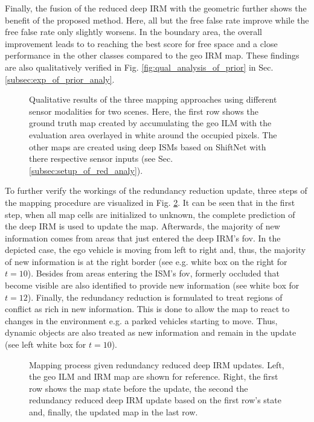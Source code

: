 Finally, the fusion of the reduced deep IRM with the geometric further shows the benefit of the proposed method. Here, all but the free false rate improve while the free false rate only slightly worsens. In the boundary area, the overall improvement leads to to reaching the best score for free space and a close performance in the other classes compared to the geo IRM map. These findings are also qualitatively verified in Fig. \ref{fig:qual_analysis_of_prior} in Sec. \ref{subsec:exp_of_prior_analy}.
\begin{figure}[H]
	\begin{center}
		\caption{\label{fig:qual_analysis_of_redundant_info}Qualitative results of the three mapping approaches using different sensor modalities for two scenes. Here, the first row shows the ground truth map created by accumulating the geo ILM with the evaluation area overlayed in white around the occupied pixels. The other maps are created using deep ISMs based on ShiftNet with there respective sensor inputs (see Sec. \ref{subsec:setup_of_red_analy}).}
	\end{center}
\end{figure}
To further verify the workings of the redundancy reduction update, three steps of the mapping procedure are visualized in Fig. \ref{fig:viz_mapping_progress}. It can be seen that in the first step, when all map cells are initialized to unknown, the complete prediction of the deep IRM is used to update the map. Afterwards, the majority of new information comes from areas that just entered the deep IRM's \gls{fov}. In the depicted case, the ego vehicle is moving from left to right and, thus, the majority of new information is at the right border (see e.g. white box on the right for $t=10$). Besides from areas entering the ISM's \gls{fov}, formerly occluded that become visible are also identified to provide new information (see white box for $t=12$). Finally, the redundancy reduction is formulated to treat regions of conflict as rich in new information. This is done to allow the map to react to changes in the environment e.g. a parked vehicles starting to move. Thus, dynamic objects are also treated as new information and remain in the update (see left white box for $t=10$).
\begin{figure}[H]
	\begin{center}
		\caption{\label{fig:viz_mapping_progress}Mapping process given redundancy reduced deep IRM updates. Left, the geo ILM and IRM map are shown for reference. Right, the first row shows the map state before the update, the second the redundancy reduced deep IRM update based on the first row's state and, finally, the updated map in the last row.}
	\end{center}
\end{figure}
%
